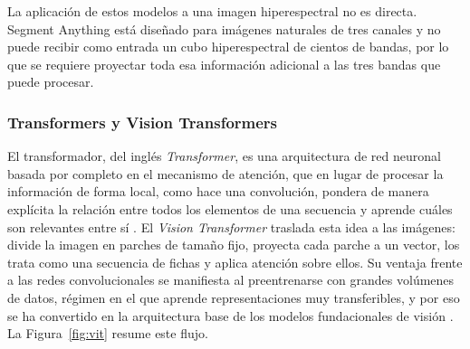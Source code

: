 La aplicación de estos modelos a una imagen hiperespectral no es directa. Segment Anything está diseñado para imágenes naturales de tres canales y no puede recibir como entrada un cubo hiperespectral de cientos de bandas, por lo que se requiere proyectar toda esa información adicional a las tres bandas que puede procesar.

\subsubsection{Transformers y Vision Transformers}

El transformador, del inglés \textit{Transformer}, es una arquitectura de red neuronal basada por completo en el mecanismo de atención, que en lugar de procesar la información de forma local, como hace una convolución, pondera de manera explícita la relación entre todos los elementos de una secuencia y aprende cuáles son relevantes entre sí \parencite{vaswani2017attention}. El \textit{Vision Transformer} traslada esta idea a las imágenes: divide la imagen en parches de tamaño fijo, proyecta cada parche a un vector, los trata como una secuencia de fichas y aplica atención sobre ellos. Su ventaja frente a las redes convolucionales se manifiesta al preentrenarse con grandes volúmenes de datos, régimen en el que aprende representaciones muy transferibles, y por eso se ha convertido en la arquitectura base de los modelos fundacionales de visión \parencite{dosovitskiy2021vit}. La Figura~\ref{fig:vit} resume este flujo.

